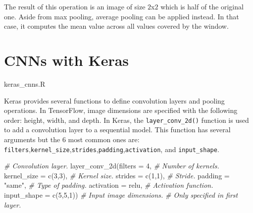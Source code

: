\documentclass[
  11pt,
]{krantz}
\makeatletter
\newenvironment{Shaded}{\begin{snugshade}}{\end{snugshade}}
\newcommand{\AttributeTok}[1]{\textcolor[rgb]{0.61,0.61,0.61}{#1}}
\newcommand{\CommentTok}[1]{\textcolor[rgb]{0.37,0.37,0.37}{\textit{#1}}}
\newcommand{\DecValTok}[1]{\textcolor[rgb]{0.06,0.06,0.06}{#1}}
\newcommand{\FunctionTok}[1]{\textcolor[rgb]{0,0,0}{#1}}
\newcommand{\NormalTok}[1]{#1}
\newcommand{\StringTok}[1]{\textcolor[rgb]{0.5,0.5,0.5}{#1}}
\newenvironment{kframe}{%
\medskip{}
\setlength{\fboxsep}{.8em}
 \def\at@end@of@kframe{}%
 \ifinner\ifhmode%
  \def\at@end@of@kframe{\end{minipage}}%
  \begin{minipage}{\columnwidth}%
 \fi\fi%
 \def\FrameCommand##1{\hskip\@totalleftmargin \hskip-\fboxsep
 \colorbox{shadecolor}{##1}\hskip-\fboxsep
     \hskip-\linewidth \hskip-\@totalleftmargin \hskip\columnwidth}%
 \MakeFramed {\advance\hsize-\width
   \@totalleftmargin\z@ \linewidth\hsize
   \@setminipage}}%
 {\par\unskip\endMakeFramed%
 \at@end@of@kframe}
\newenvironment{rmdblock}[1]
  {
  \begin{itemize}
  \renewcommand{\labelitemi}{
    \raisebox{-.7\height}[0pt][0pt]{
      {\setkeys{Gin}{width=3em,keepaspectratio}\texttt{[image: images/icons/\#1]}}
    }
  }
  \setlength{\fboxsep}{1em}
  \begin{kframe}
  \item
  }
  {
  \end{kframe}
  \end{itemize}
  }
\newenvironment{rmdfolder}
  {\begin{rmdblock}{folder}}
  {\end{rmdblock}}
\makeatother
\begin{document}
The result of this operation is an image of size \(2\)x\(2\) which is half of the original one. Aside from max pooling, average pooling can be applied instead. In that case, it computes the mean value across all values covered by the window.

\hypertarget{cnns-with-keras}{%
\section{CNNs with Keras}\label{cnns-with-keras}}

\begin{rmdfolder}
keras\_cnns.R
\end{rmdfolder}

Keras provides several functions to define convolution layers and pooling operations. In TensorFlow, image dimensions are specified with the following order: height, width, and depth. In Keras, the \texttt{layer\_conv\_2d()} function is used to add a convolution layer to a sequential model. This function has several arguments but the \(6\) most common ones are: \texttt{filters},\texttt{kernel\_size},\texttt{strides},\texttt{padding},\texttt{activation}, and \texttt{input\_shape}.

\begin{Shaded}
\begin{Highlighting}[]
\CommentTok{\# Convolution layer.}
\FunctionTok{layer\_conv\_2d}\NormalTok{(}\AttributeTok{filters =} \DecValTok{4}\NormalTok{, }\CommentTok{\# Number of kernels.}
                \AttributeTok{kernel\_size =} \FunctionTok{c}\NormalTok{(}\DecValTok{3}\NormalTok{,}\DecValTok{3}\NormalTok{), }\CommentTok{\# Kernel size.}
                \AttributeTok{strides =} \FunctionTok{c}\NormalTok{(}\DecValTok{1}\NormalTok{,}\DecValTok{1}\NormalTok{), }\CommentTok{\# Stride.}
                \AttributeTok{padding =} \StringTok{"same"}\NormalTok{, }\CommentTok{\# Type of padding.}
                \AttributeTok{activation =} \StringTok{\textquotesingle{}relu\textquotesingle{}}\NormalTok{, }\CommentTok{\# Activation function.}
                \AttributeTok{input\_shape =} \FunctionTok{c}\NormalTok{(}\DecValTok{5}\NormalTok{,}\DecValTok{5}\NormalTok{,}\DecValTok{1}\NormalTok{)) }\CommentTok{\# Input image dimensions.}
                                        \CommentTok{\# Only specified in first layer.}
\end{Highlighting}
\end{Shaded}
\end{document}
